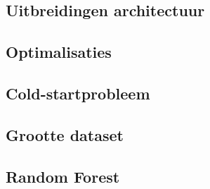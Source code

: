 \subsection{Uitbreidingen architectuur}

\subsection{Optimalisaties}


\subsection{Cold-startprobleem}

\subsection{Grootte dataset}

\subsection{Random Forest}

